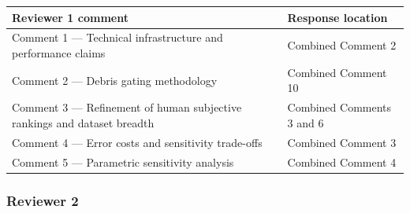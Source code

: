 \documentclass[
  11pt,
  a4paper,
]{article}
\newcounter{none} %
\begin{document}
{\def\LTcaptype{none} %
\begin{longtable}[]{@{}
  >{\raggedright\arraybackslash}p{}
  >{\raggedright\arraybackslash}p{}@{}}
\toprule\noalign{}
\begin{minipage}[b]{\linewidth}\raggedright
Reviewer 1 comment
\end{minipage} & \begin{minipage}[b]{\linewidth}\raggedright
Response location
\end{minipage} \\
\midrule\noalign{}
\endhead
\bottomrule\noalign{}
\endlastfoot
Comment 1 --- Technical infrastructure and performance claims & Combined
Comment 2 \\
Comment 2 --- Debris gating methodology & Combined Comment 10 \\
Comment 3 --- Refinement of human subjective rankings and dataset
breadth & Combined Comments 3 and 6 \\
Comment 4 --- Error costs and sensitivity trade-offs & Combined Comment
3 \\
Comment 5 --- Parametric sensitivity analysis & Combined Comment 4 \\
\end{longtable}
}

\subsubsection{Reviewer 2}\label{reviewer-2}
\end{document}
